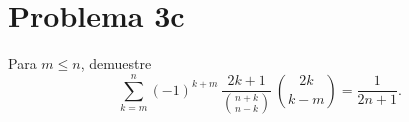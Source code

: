 \section*{Problema 3c}
Para \(m\le n\), demuestre
\[\sum_{k=m}^n (-1)^{k+m}\,\frac{2k+1}{\binom{n+k}{n-k}}\,
  \binom{2k}{k-m}
  = \frac{1}{2n+1}.\]
